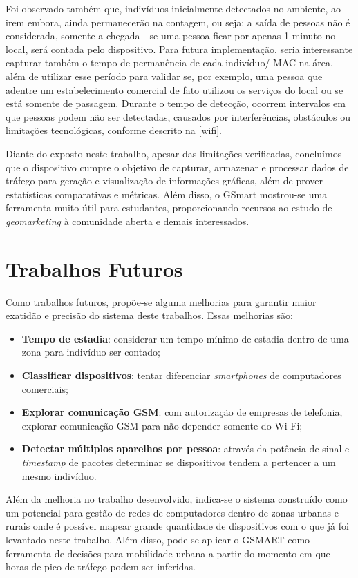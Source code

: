 Foi observado também que, indivíduos inicialmente detectados no ambiente, ao irem embora, ainda permanecerão na contagem, ou seja: a saída de pessoas não é considerada, somente a chegada - se uma pessoa ficar por apenas 1 minuto no local, será contada pelo dispositivo. Para futura implementação, seria interessante capturar também o tempo de permanência de cada indivíduo/ MAC na área, além de utilizar esse período para validar se, por exemplo, uma pessoa que adentre um estabelecimento comercial de fato utilizou os serviços do local ou se está somente de passagem. Durante o tempo de detecção, ocorrem intervalos em que pessoas podem não ser detectadas, causados por interferências, obstáculos ou limitações tecnológicas, conforme descrito na \autoref{wifi}.

Diante do exposto neste trabalho, apesar das limitações verificadas, concluímos que o dispositivo cumpre o objetivo de capturar, armazenar e processar dados de tráfego para geração e visualização de informações gráficas, além de prover estatísticas comparativas e métricas. Além disso, o GSmart mostrou-se uma ferramenta muito útil para estudantes, proporcionando recursos ao estudo de \emph{geomarketing} à comunidade aberta e demais interessados. 


\section{Trabalhos Futuros}
Como trabalhos futuros, propõe-se alguma melhorias para garantir maior exatidão e
precisão do sistema deste trabalhos. Essas melhorias são:
\begin{itemize}
    \item \textbf{Tempo de estadia}: considerar um tempo mínimo de estadia dentro de uma zona para indivíduo ser
    contado;
    \item \textbf{Classificar dispositivos}: tentar diferenciar \emph{smartphones} de computadores comerciais;
    \item \textbf{Explorar comunicação GSM}: com autorização de empresas de telefonia, explorar comunicação GSM
    para não depender somente do Wi-Fi;
    \item \textbf{Detectar múltiplos aparelhos por pessoa}: através da potência de sinal e \emph{timestamp}
    de pacotes determinar se dispositivos tendem a pertencer a um mesmo indivíduo.
\end{itemize}

Além da melhoria no trabalho desenvolvido, indica-se o sistema construído como um potencial para gestão de redes
de computadores dentro de zonas urbanas e rurais onde é possível mapear grande quantidade de dispositivos com o
que já foi levantado neste trabalho. Além disso, pode-se aplicar o GSMART como ferramenta de decisões para mobilidade
urbana a partir do momento em que horas de pico de tráfego podem ser inferidas.

